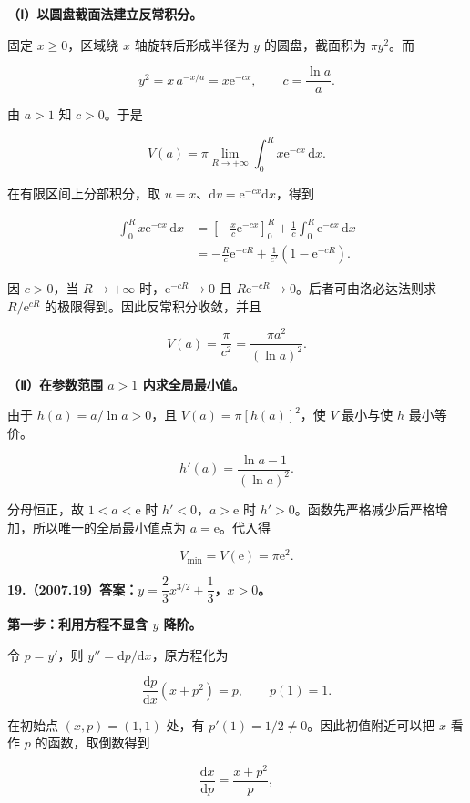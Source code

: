 \documentclass[UTF8,11pt,fontset=windows]{ctexart}
\begin{document}
\textbf{（Ⅰ）以圆盘截面法建立反常积分。}

固定 $x\ge0$，区域绕 $x$ 轴旋转后形成半径为 $y$ 的圆盘，截面积为 $\pi y^2$。而

$$
y^2=x\,a^{-x/a}=x\mathrm e^{-cx},
\qquad c=\frac{\ln a}{a}.
$$

由 $a>1$ 知 $c>0$。于是

$$
V(a)=\pi\lim_{R\to+\infty}\int_0^R x\mathrm e^{-cx}\,\mathrm dx.
$$

在有限区间上分部积分，取 $u=x$、$\mathrm dv=\mathrm e^{-cx}\mathrm dx$，得到

$$
\begin{aligned}
\int_0^R x\mathrm e^{-cx}\,\mathrm dx
&=\left[-\frac{x}{c}\mathrm e^{-cx}\right]_0^R
 +\frac1c\int_0^R\mathrm e^{-cx}\,\mathrm dx\\
&=-\frac Rc\mathrm e^{-cR}+\frac1{c^2}(1-\mathrm e^{-cR}).
\end{aligned}
$$

因 $c>0$，当 $R\to+\infty$ 时，$\mathrm e^{-cR}\to0$ 且 $R\mathrm e^{-cR}\to0$。后者可由洛必达法则求 $R/\mathrm e^{cR}$ 的极限得到。因此反常积分收敛，并且

$$
\boxed{V(a)=\frac\pi{c^2}=\frac{\pi a^2}{(\ln a)^2}.}
$$

\textbf{（Ⅱ）在参数范围 $a>1$ 内求全局最小值。}

由于 $h(a)=a/\ln a>0$，且 $V(a)=\pi[h(a)]^2$，使 $V$ 最小与使 $h$ 最小等价。

$$
h'(a)=\frac{\ln a-1}{(\ln a)^2}.
$$

分母恒正，故 $1<a<\mathrm e$ 时 $h'<0$，$a>\mathrm e$ 时 $h'>0$。函数先严格减少后严格增加，所以唯一的全局最小值点为 $a=\mathrm e$。代入得

$$
\boxed{V_{\min}=V(\mathrm e)=\pi\mathrm e^2.}
$$

\clearpage

\textbf{19.（2007.19）答案：$y=\dfrac23x^{3/2}+\dfrac13$，$x>0$。}

\textbf{第一步：利用方程不显含 $y$ 降阶。}

令 $p=y'$，则 $y''=\mathrm dp/\mathrm dx$，原方程化为

$$
\frac{\mathrm dp}{\mathrm dx}(x+p^2)=p,
\qquad p(1)=1.
$$

在初始点 $(x,p)=(1,1)$ 处，有 $p'(1)=1/2\ne0$。因此初值附近可以把 $x$ 看作 $p$ 的函数，取倒数得到

$$
\frac{\mathrm dx}{\mathrm dp}=\frac{x+p^2}{p},
$$
\end{document}
